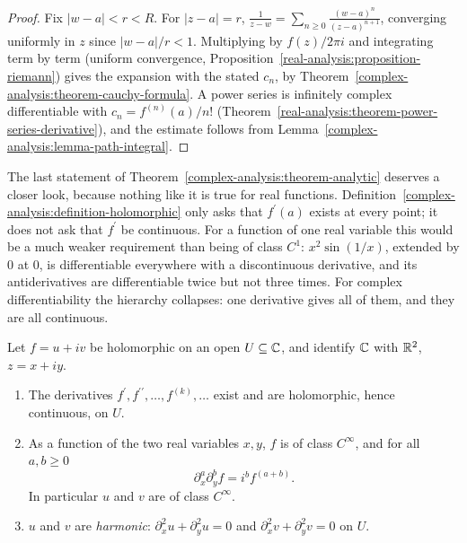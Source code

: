\begin{proof}
Fix $|w - a| < r < R$. For $|z - a| = r$, $\frac{1}{z - w} = \sum_{n \geq 0}\frac{(w - a)^n}{(z - a)^{n+1}}$, converging uniformly in $z$ since $|w - a|/r < 1$. Multiplying by $f(z)/2\pi i$ and integrating term by
term (uniform convergence, Proposition~\ref{real-analysis:proposition-riemann}) gives the expansion with the stated $c_n$, by Theorem~\ref{complex-analysis:theorem-cauchy-formula}. A power series is
infinitely complex differentiable with $c_n = f^{(n)}(a)/n!$ (Theorem~\ref{real-analysis:theorem-power-series-derivative}), and the estimate follows from
Lemma~\ref{complex-analysis:lemma-path-integral}.
\end{proof}

The last statement of Theorem~\ref{complex-analysis:theorem-analytic} deserves a closer look, because nothing like it is true for real functions. Definition~\ref{complex-analysis:definition-holomorphic} only
asks that $f^{\prime}(a)$ exists at every point; it does not ask that $f^{\prime}$ be continuous. For a function of one real variable this would be a much weaker requirement than being of class $C^1$:
$x^2\sin(1/x)$, extended by $0$ at $0$, is differentiable everywhere with a discontinuous derivative, and its antiderivatives are differentiable twice but not three times. For complex differentiability
the hierarchy collapses: one derivative gives all of them, and they are all continuous.

\begin{corollary}\label{complex-analysis:corollary-smooth-harmonic}
Let $f = u + iv$ be holomorphic on an open $U \subseteq \mathbb{C}$, and identify $\mathbb{C}$ with $\mathbb{R}^2$, $z = x + iy$.
\begin{enumerate}
\item The derivatives $f^{\prime}, f^{\prime\prime}, \ldots, f^{(k)}, \ldots$ exist and are holomorphic, hence continuous, on $U$.
\item As a function of the two real variables $x, y$, $f$ is of class $C^\infty$, and for all $a, b \geq 0$
\[
\partial_x^a\partial_y^bf = i^bf^{(a + b)} .
\]
In particular $u$ and $v$ are of class $C^\infty$.
\item $u$ and $v$ are \emph{harmonic}: $\partial_x^2u + \partial_y^2u = 0$ and $\partial_x^2v + \partial_y^2v = 0$ on $U$.
\end{enumerate}
\end{corollary}


